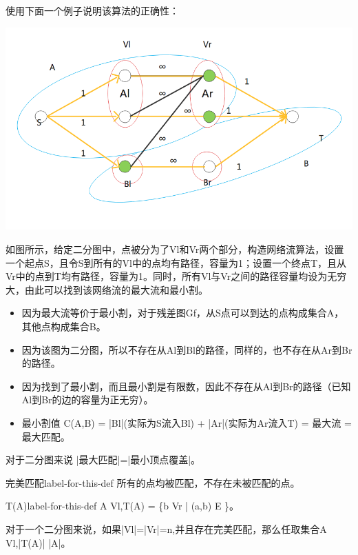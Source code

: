 使用下面一个例子说明该算法的正确性：\\
\centerline{\includegraphics[scale=0.6]{Ln11.image/networkflow3.png}}
\begin{example}
  如图所示，给定二分图中，点被分为了Vl和Vr两个部分，构造网络流算法，设置一个起点S，且令S到所有的Vl中的点均有路径，容量为1；设置一个终点T，且从Vr中的点到T均有路径，容量为1。同时，所有Vl与Vr之间的路径容量均设为无穷大，由此可以找到该网络流的最大流和最小割。
\end{example}
\begin{itemize}
  \item 因为最大流等价于最小割，对于残差图Gf，从S点可以到达的点构成集合A，其他点构成集合B。
  \item 因为该图为二分图，所以不存在从Al到Bl的路径，同样的，也不存在从Ar到Br的路径。
  \item 因为找到了最小割，而且最小割是有限数，因此不存在从Al到Br的路径（已知Al到Br的边的容量为正无穷）。
  \item 最小割值 C(A,B) = |Bl|(实际为S流入Bl) + |Ar|(实际为Ar流入T) = 最大流 = 最大匹配。
\end{itemize}
对于二分图来说 |最大匹配|=|最小顶点覆盖|。

\begin{definition}{完美匹配}{label-for-this-def}
    所有的点均被匹配，不存在未被匹配的点。
\end{definition}

\begin{definition}{T(A)}{label-for-this-def}
  A \subseteq Vl,T(A) = \{b \in Vr | (a,b) \in E \}。
\end{definition}

对于一个二分图来说，如果|Vl|=|Vr|=n,并且存在完美匹配，那么任取集合A \subseteq Vl,|T(A)| \ge |A|。


